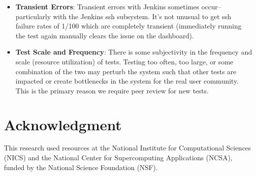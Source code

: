 \documentclass[10pt, conference, compsocconf]{IEEEtran}
\begin{document}
\begin{itemize}

\item \textbf{Transient Errors}: Transient errors with Jenkins sometimes occur--particularly with the Jenkins ssh subsystem. 
It's not unusual to get ssh failure rates of 1/100 which are completely transient (immediately running the test again manually clears the issue on the dashboard).

\item \textbf{Test Scale and Frequency}: There is some subjectivity in the frequency and scale (resource utilization) of tests.
Testing too often, too large, or some combination of the two may perturb the system such that other tests are impacted or create bottlenecks in the system for the real user community.
This is the primary reason we require peer review for new tests.
\end{itemize}

\section*{Acknowledgment}
This research used resources at the National Institute for Computational Sciences (NICS) and the National Center for Supercomputing Applications (NCSA), funded by the National Science Foundation (NSF). 



\end{document}
